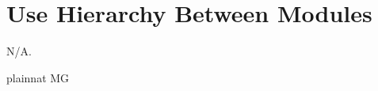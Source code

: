 \documentclass[12pt, titlepage]{article}
\begin{document}
\section{Use Hierarchy Between Modules} \label{SecUse}
N/A.
%
%


 {plainnat}
 {MG}
\end{document}
